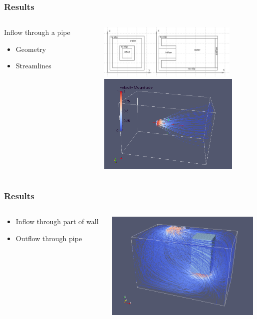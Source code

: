 \documentclass{beamer}
\begin{document}
\begin{frame}
\frametitle{Results}
\begin{columns}
\begin{column}{0.35\textwidth}
Inflow through a pipe
\begin{itemize}
\item Geometry
\item Streamlines
\end{itemize}
\end{column}
\begin{column}{0.65\textwidth}
\flushright
\includegraphics[height=2.6cm]{pipeinflow.png}\\
\includegraphics[height=4.8cm]{pipeinflw.png}
\end{column}
\end{columns}
\end{frame}

\begin{frame}
\frametitle{Results}
\begin{columns}
\begin{column}{0.30\textwidth}
\begin{itemize}
\item Inflow through part of wall
\item Outflow through pipe
\end{itemize}

\end{column}
\begin{column}{0.70\textwidth}
\includegraphics[height=5.2cm]{Pipe.png}
\end{column}
\end{columns}
\end{frame}
\end{document}
